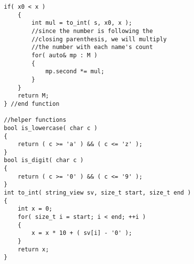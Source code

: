 \begin{lstlisting}[style=customc, caption={Recursion}]
    if( x0 < x )
    {
        int mul = to_int( s, x0, x );
        //since the number is following the
        //closing parenthesis, we will multiply
        //the number with each name's count
        for( auto& mp : M )
        {
            mp.second *= mul;
        }
    }
    return M;
} //end function

//helper functions
bool is_lowercase( char c )
{
    return ( c >= 'a' ) && ( c <= 'z' );
}
bool is_digit( char c )
{
    return ( c >= '0' ) && ( c <= '9' );
}
int to_int( string_view sv, size_t start, size_t end )
{
    int x = 0;
    for( size_t i = start; i < end; ++i )
    {
        x = x * 10 + ( sv[i] - '0' );
    }
    return x;
}
\end{lstlisting}